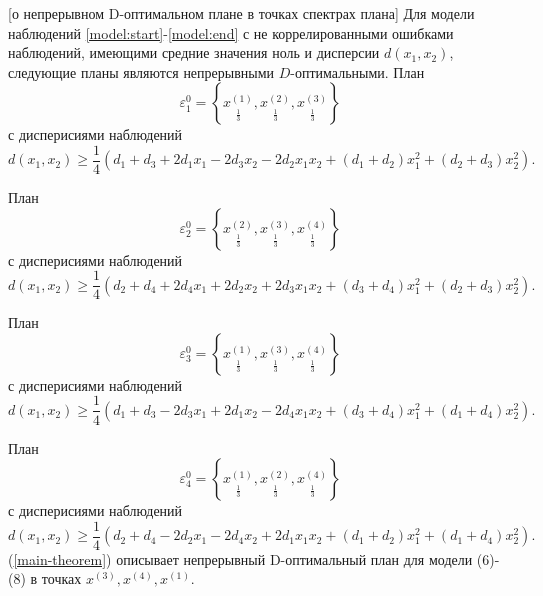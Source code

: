 \begin{theorem}\label{main-theorem}[о непрерывном D-оптимальном плане в точках спектрах плана]
	Для модели наблюдений \eqref{model:start}-\eqref{model:end} с не коррелированными ошибками наблюдений, имеющими средние значения ноль и дисперсии $d(x_1, x_2)$, следующие планы являются непрерывными $D$-оптимальными. План
	\begin{equation} \label{main-theorem:plan-1}
	\varepsilon_1^{0} = \left \{ 
	\underset{\frac 1 3} {x^{(1)}},
	\underset{\frac 1 3} {x^{(2)}},
	\underset{\frac 1 3} {x^{(3)}}
	\right \}
	\end{equation}
	с дисперисиями наблюдений
	\begin{equation}
	d(x_1, x_2) \ge \frac 1 4 (d_1 + d_3 + 2 d_1 x_1 - 2 d_3 x_2 - 2d_2 x_1 x_2 + (d_1 + d_2)x_1^2 + (d_2 + d_3)x_2^2).
	\end{equation}
	
	План
	\begin{equation}
	\varepsilon_2^{0} = \left \{ 
	\underset{\frac 1 3} {x^{(2)}},
	\underset{\frac 1 3} {x^{(3)}},
	\underset{\frac 1 3} {x^{(4)}}
	\right \}
	\end{equation}
	с дисперисиями наблюдений
	\begin{equation}
	d(x_1, x_2) \ge \frac 1 4 (d_2 + d_4 + 2 d_4 x_1 + 2 d_2 x_2 + 2 d_3 x_1 x_2 + (d_3 + d_4)x_1^2 + (d_2 + d_3)x_2^2).
	\end{equation}
	
	План
	\begin{equation}
	\varepsilon_3^{0} = \left \{ 
	\underset{\frac 1 3} {x^{(1)}},
	\underset{\frac 1 3} {x^{(3)}},
	\underset{\frac 1 3} {x^{(4)}}
	\right \}
	\end{equation}
	с дисперисиями наблюдений
	\begin{equation}
	d(x_1, x_2) \ge \frac 1 4 (d_1 + d_3 - 2 d_3 x_1 + 2 d_1 x_2 - 2 d_4 x_1 x_2 + (d_3 + d_4)x_1^2 + (d_1 + d_4)x_2^2).
	\end{equation}
	
	План
	\begin{equation}
	\varepsilon_4^{0} = \left \{ 
	\underset{\frac 1 3} {x^{(1)}},
	\underset{\frac 1 3} {x^{(2)}},
	\underset{\frac 1 3} {x^{(4)}}
	\right \}
	\end{equation}
	с дисперисиями наблюдений
	\begin{equation}
	d(x_1, x_2) \ge \frac 1 4 (d_2 + d_4 - 2 d_2 x_1 - 2 d_4 x_2 + 2 d_1 x_1 x_2 + (d_1 + d_2)x_1^2 + (d_1 + d_4)x_2^2).
	\end{equation}
	(\ref{main-theorem}) описывает непрерывный D-оптимальный план для модели (6)-(8) в точках $x^{(3)}, x^{(4)}, x^{(1)}$.\\
\end{theorem}
